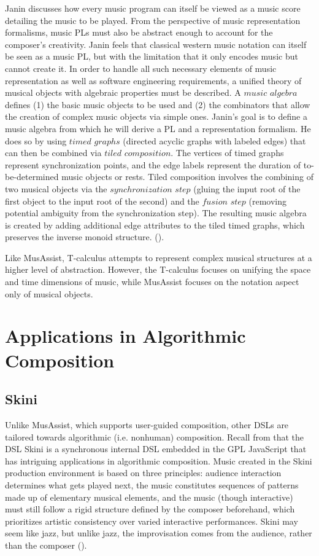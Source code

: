 \documentclass{report}
\newcommand\citeparen[1]{(\cite{#1})}
\begin{document}
Janin  discusses how  every music  program can itself be  viewed  as a music score detailing the music to be  played. From the perspective  of music representation formalisms, music PLs must also be abstract enough to account for the composer's  creativity. Janin feels that classical western music notation can itself be seen as a music PL, but with the limitation  that  it only encodes music but cannot create it. In order to  handle all such necessary elements of music representation as  well as  software engineering requirements, a unified  theory of musical objects  with algebraic properties must be described. A  $music$ $algebra$  defines  (1) the basic music  objects  to be  used and (2) the combinators that allow the  creation of complex music  objects  via simple ones. Janin's goal is to  define a  music algebra from which he will derive a PL and a representation formalism. He does so by using $timed$  $graphs$  (directed acyclic graphs with labeled edges) that can then be combined via $tiled$ $composition$. The vertices of timed  graphs represent synchronization points, and the edge labels represent the duration of to-be-determined music objects  or rests. Tiled  composition  involves the combining of two musical objects via the $synchronization$  $step$ (gluing the input  root of the first  object to the input root of the  second) and the $fusion$ $step$ (removing potential ambiguity from the synchronization step). The resulting music algebra is created by adding additional edge attributes to the tiled timed graphs,  which  preserves the inverse monoid structure.
\citeparen{janin}.

Like MusAssist, T-calculus attempts to represent complex musical structures at a higher level of abstraction. However, the T-calculus focuses on unifying the space and time dimensions of music, while MusAssist focuses on the notation aspect only of musical objects.

\section{Applications in Algorithmic Composition}
\label{sec:alg_comp}
\subsection{Skini}
Unlike MusAssist, which supports user-guided composition, other DSLs are tailored towards algorithmic (i.e. nonhuman) composition. Recall from  that the DSL Skini is a synchronous internal DSL embedded in the GPL JavaScript that has intriguing applications in algorithmic composition. Music  created in the Skini production environment is based on three principles: audience  interaction determines what gets played next, the music constitutes sequences of patterns made up of elementary musical elements, and the  music (though interactive) must still follow  a  rigid structure defined by the composer beforehand, which prioritizes artistic consistency  over varied interactive performances. Skini may  seem like jazz, but  unlike jazz, the improvisation comes  from the  audience,  rather than the composer \citeparen{petit_serrano_2020}.
\end{document}
